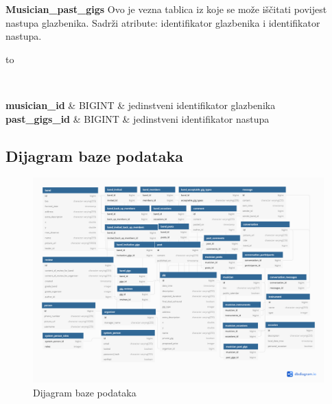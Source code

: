 		\textbf{Musician\_past\_gigs}
	Ovo je vezna tablica iz koje se može iščitati povijest nastupa glazbenika. Sadrži atribute: identifikator glazbenika i identifikator nastupa.
	\begin{longtabu} to \textwidth {|X[6, l+3]|X[6, l]|X[20, l]|}
		
		\hline {}	 \\[3pt] \hline
		\endfirsthead
		
		\hline 
		\endlastfoot
		
		\textbf{musician\_id} & BIGINT & jedinstveni identifikator glazbenika \\ \hline
		\textbf{past\_gigs\_id} & BIGINT & jedinstveni identifikator nastupa \\ \hline
		
		
		
	\end{longtabu}
	


			
			\subsection{Dijagram baze podataka}
			
			\begin{figure}[H]
			\begin{center}
				\includegraphics[width=17cm]{slike/ERModel.PNG}
			\end{center}
			\caption{Dijagram baze podataka}
			\label{fig:dijagramBaze}
		\end{figure}
			
			
			
